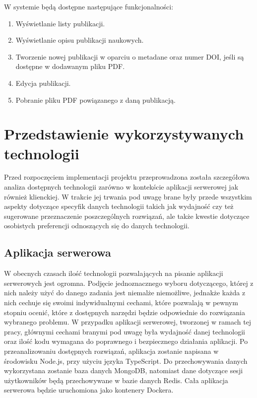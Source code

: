 \documentclass[a4paper,12pt,twoside,openany]{report}
\begin{document}
W systemie będą dostępne następujące funkcjonalności:		
\begin{enumerate}
	\item Wyświetlanie listy publikacji.
	\item Wyświetlanie opisu publikacji naukowych.
	\item Tworzenie nowej publikacji w oparciu o metadane oraz numer DOI, jeśli są dostępne w dodawanym pliku PDF.
	\item Edycja publikacji.
	\item Pobranie pliku PDF powiązanego z daną publikacją.
\end{enumerate}
\chapter{Przedstawienie wykorzystywanych technologii}
Przed rozpoczęciem implementacji projektu przeprowadzona została szczegółowa analiza dostępnych technologii zarówno w kontekście aplikacji serwerowej jak również klienckiej. W trakcie jej trwania pod uwagę brane były przede wszystkim aspekty dotyczące specyfik danych technologii takich jak wydajność czy też sugerowane przeznaczenie poszczególnych rozwiązań, ale także kwestie dotyczące osobistych preferencji odnoszących się do danych technologii. 
\section{Aplikacja serwerowa}
W obecnych czasach ilość technologii pozwalających na pisanie aplikacji serwerowych jest ogromna. Podjęcie jednoznacznego wyboru dotyczącego, której z nich należy użyć do danego zadania jest niemalże niemożliwe, jednakże każda z nich cechuje się swoimi indywidualnymi cechami, które pozwalają w pewnym stopniu ocenić, które z dostępnych narzędzi będzie odpowiednie do rozwiązania wybranego problemu. W przypadku aplikacji serwerowej, tworzonej w ramach tej pracy, głównymi cechami branymi pod uwagę była wydajność danej technologii oraz ilość kodu wymagana do poprawnego i bezpiecznego działania aplikacji. Po przeanalizowaniu dostępnych rozwiązań, aplikacja zostanie napisana w środowisku Node.js, przy użyciu języka TypeScript. Do przechowywania danych wykorzystana zostanie baza danych MongoDB, natomiast dane dotyczące sesji użytkowników będą przechowywane w bazie danych Redis. Cała aplikacja serwerowa będzie uruchomiona jako kontenery Dockera.
\end{document}
